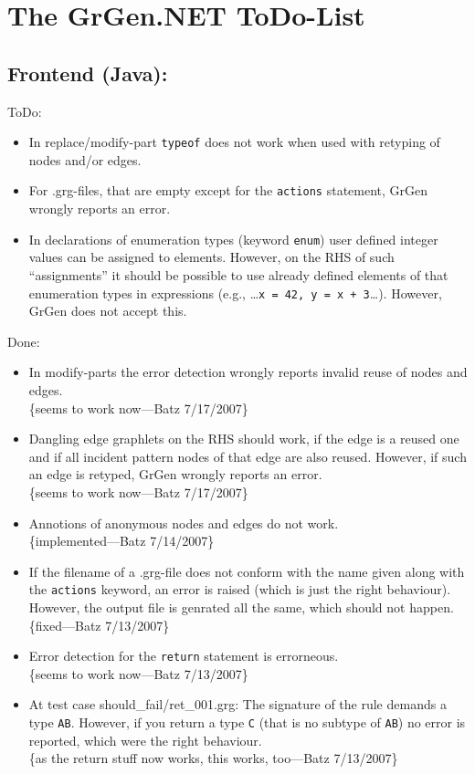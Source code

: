 \documentclass[12pt,a4paper]{article}
\begin{document}
\section*{\LARGE The GrGen.NET ToDo-List}



\subsection*{Frontend (Java):}
ToDo:
\begin{itemize}
	\item In replace/modify-part {\tt typeof} does not work when used with retyping of nodes and/or edges.
	\item For .grg-files, that are empty except for the {\tt actions} statement, GrGen wrongly reports an error.
	\item In declarations of enumeration types (keyword {\tt enum}) user defined integer values can be assigned to elements.
	  However, on the RHS of such "`assignments"' it should be possible to use already defined elements of that enumeration types in expressions (e.g., \dots{}{\tt{}x = 42, y = x + 3}\dots). However, GrGen does not accept this.
\end{itemize}
Done:
\begin{itemize}
	\item In modify-parts the error detection wrongly reports invalid reuse of nodes and edges.\\
		\{seems to work now---Batz 7/17/2007\}
	\item Dangling edge graphlets on the RHS should work, if the edge is a reused one and if all incident pattern nodes of that edge are also reused.
    However, if such an edge is retyped, GrGen wrongly reports an error.\\
		\{seems to work now---Batz 7/17/2007\}
	\item Annotions of anonymous nodes and edges do not work.\\
		\{implemented---Batz 7/14/2007\}
	\item If the filename of a .grg-file does not conform with the name given along with the {\tt actions} keyword, an error is raised (which is just the right behaviour). However, the output file is genrated all the same, which should not happen.\\
    \{fixed---Batz 7/13/2007\}
	\item Error detection for the {\tt return} statement is errorneous.\\
		\{seems to work now---Batz 7/13/2007\}
	\item At test case should\_fail/ret\_001.grg:
  	The signature of the rule demands a type {\tt AB}.
	However, if you return a type {\tt C} (that is no subtype of {\tt AB}) no error is reported, which were the right behaviour.\\
		\{as the return stuff now works, this works, too---Batz 7/13/2007\}
\end{itemize}
\end{document}
